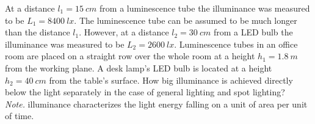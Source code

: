 \documentclass[11pt]{article}
\begin{document}

\probeng
At a distance $l_1=\SI{15}{cm}$ from a luminescence tube the illuminance was measured to be $L_1=\SI{8400}{lx}$. The luminescence tube can be assumed to be much longer than the distance $l_1$. However, at a distance $l_2=\SI{30}{cm}$ from a LED bulb the illuminance was measured to be $L_2=\SI{2600}{lx}$. Luminescence tubes in an office room are placed on a straight row over the whole room at a height $h_1=\SI{1.8}{m}$ from the working plane. A desk lamp’s LED bulb is located at a height $h_2=\SI{40}{cm}$ from the table’s surface. How big illuminance is achieved directly below the light separately in the case of general lighting and spot lighting?\\
\emph{Note.} illuminance characterizes the light energy falling on a unit of area per unit of time.
\probend
\bigskip

\end{document}
